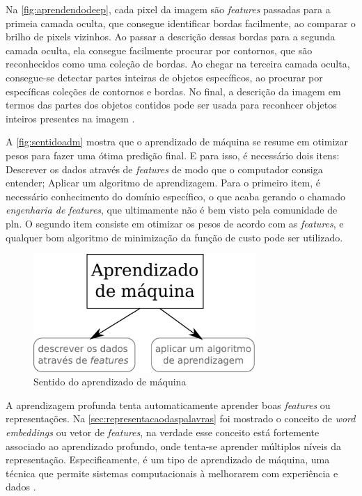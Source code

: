 Na \autoref{fig:aprendendodeep}, cada pixel da imagem são \textit{features} passadas para a primeia camada oculta, que consegue identificar bordas facilmente, ao comparar o brilho de pixels vizinhos. Ao passar a descrição dessas bordas para a segunda camada oculta, ela consegue facilmente procurar por contornos, que são reconhecidos como uma coleção de bordas. Ao chegar na terceira camada oculta, consegue-se detectar partes inteiras de objetos específicos, ao procurar por específicas coleções de contornos e bordas. No final, a descrição da imagem em termos das partes dos objetos contidos pode ser usada para reconhcer objetos inteiros presentes na imagem \cite{Bengio-et-al-2015-Book}.


A \autoref{fig:sentidoadm} mostra que o aprendizado de máquina se resume em otimizar pesos para fazer uma ótima predição final. E para isso, é necessário dois itens: Descrever os dados através de \textit{features} de modo que o computador consiga entender; Aplicar um algoritmo de aprendizagem. Para o primeiro item, é necessário conhecimento do domínio específico, o que acaba gerando o chamado \textit{engenharia de features}, que ultimamente não é bem visto pela comunidade de \ac{pln}. O segundo item consiste em otimizar os pesos de acordo com as \textit{features}, e qualquer bom algoritmo de minimização da função de custo pode ser utilizado.

\begin{figure}
\centering
\caption{Sentido do aprendizado de máquina} \label{fig:sentidoadm}
\includegraphics[width=0.75\textwidth]{img/sentidoadm}
\end{figure}

A aprendizagem profunda tenta automaticamente aprender boas \textit{features} ou representações. Na \autoref{sec:representacaodaspalavras} foi mostrado o conceito de \textit{word embeddings} ou vetor de \textit{features}, na verdade esse conceito está fortemente associado ao aprendizado profundo, onde tenta-se aprender múltiplos níveis da representação. Especificamente, é um tipo de aprendizado de máquina, uma técnica que permite sistemas computacionais à melhorarem com experiência e dados \cite{Bengio-et-al-2015-Book}.

